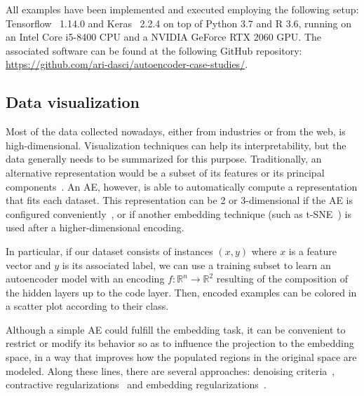 All examples have been implemented and executed employing the following setup: Tensorflow~ 1.14.0 and Keras~ 2.2.4 on top of Python 3.7 and R 3.6, running on an Intel Core i5-8400 CPU and a NVIDIA GeForce RTX 2060 GPU. The associated software can be found at the following GitHub repository: \url{https://github.com/ari-dasci/autoencoder-case-studies/}.


\subsection{Data visualization}

Most of the data collected nowadays, either from industries or from the web, is high-dimensional. Visualization techniques can help its interpretability, but the data generally needs to be summarized for this purpose. Traditionally, an alternative representation would be a subset of its features or its principal components~. An AE, however, is able to automatically compute a representation that fits each dataset. This representation can be 2 or 3-dimensional if the AE is configured conveniently~, or if another embedding technique (such as t-SNE~) is used after a higher-dimensional encoding.

In particular, if our dataset consists of instances $(x, y)$ where $x$ is a feature vector and $y$ is its associated label, we can use a training subset to learn an autoencoder model with an encoding $f: \mathbb R^n\rightarrow \mathbb R^2$ resulting of the composition of the hidden layers up to the code layer. Then, encoded examples can be colored in a scatter plot according to their class.

Although a simple AE could fulfill the embedding task, it can be convenient to restrict or modify its behavior so as to influence the projection to the embedding space, in a way that improves how the populated regions in the original space are modeled. Along these lines, there are several approaches: denoising criteria~, contractive regularizations~ and embedding regularizations~.

